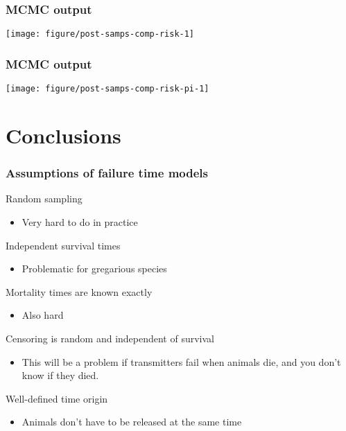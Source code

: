 \documentclass[color=usenames,dvipsnames]{beamer}\usepackage[]{graphicx}\usepackage[]{xcolor}
\newenvironment{knitrout}{}{} %
\begin{document}
\begin{frame}[fragile]
  \frametitle{MCMC output}
\begin{knitrout}
\color{fgcolor}

{\centering \texttt{[image: figure/post-samps-comp-risk-1]} 

}


\end{knitrout}
\end{frame}




\begin{frame}[fragile]
  \frametitle{MCMC output}
\begin{knitrout}
\color{fgcolor}

{\centering \texttt{[image: figure/post-samps-comp-risk-pi-1]} 

}


\end{knitrout}
\end{frame}







\section{Conclusions}




\begin{frame}
  \frametitle{Assumptions of failure time models}
  Random sampling
  \begin{itemize}
    \item Very hard to do in practice
  \end{itemize}
  \vfill
  Independent survival times \\
  \begin{itemize}
    \item Problematic for gregarious species
  \end{itemize}
  \vfill
  Mortality times are known exactly
  \begin{itemize}
    \item Also hard
  \end{itemize}
  \vfill
  Censoring is random and independent of survival
  \begin{itemize}
    \item This will be a problem if transmitters fail when animals
      die, and you don't know if they died.
  \end{itemize}
  \vfill
  Well-defined time origin
  \begin{itemize}
    \item Animals don't have to be released at the same time 
  \end{itemize}
\end{frame}
\end{document}
